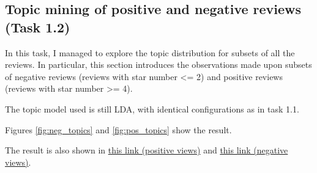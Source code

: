 \documentclass[11pt]{article}
\begin{document}
\subsection{Topic mining of positive and negative reviews (Task 1.2)}
In this task, I managed to explore the topic distribution for subsets of all the reviews.
In particular, this section introduces the observations made upon subsets of negative reviews (reviews with star number <= 2) and positive reviews (reviews with star number >= 4).

The topic model used is still LDA, with identical configurations as in task 1.1.

Figures \ref{fig:neg_topics} and \ref{fig:pos_topics} show the result.

The result is also shown in
\href{http://jiacheng-pan.me/standalone/datamining_capstone/task1/pos_reviews_topics.html}{this link (positive views)}
and 
\href{http://jiacheng-pan.me/standalone/datamining_capstone/task1/neg_reviews_topics.html}{this link (negative views)}.
\end{document}
